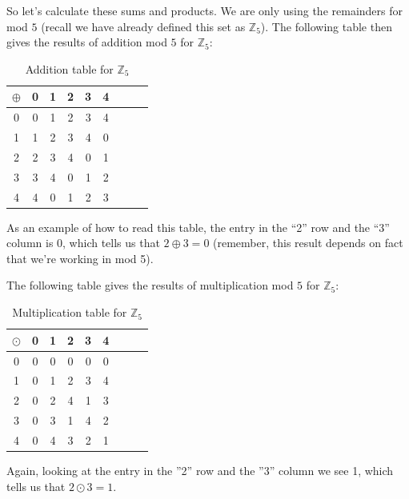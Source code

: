 So let's calculate these sums and products.  We are only using the remainders for mod $5$ (recall we have already defined this set as  ${\mathbb Z}_{5}$).
The following table then gives the results of addition mod $5$ for ${\mathbb Z}_{5}$:

\begin{table}[h]
\caption{\label{groups_Z5_add_table}Addition table for ${\mathbb Z}_5$}{\small
\begin{center}
\begin{tabular}{c|cccccccc}
$\oplus$ & 0 & 1 & 2 & 3 & 4 \\
\hline
0        & 0 & 1 & 2 & 3 & 4 \\
1       & 1 & 2 & 3 & 4 & 0 \\
2       & 2 & 3 & 4 & 0 & 1\\
3       & 3 & 4 & 0 & 1 & 2\\
4       & 4 & 0 & 1 & 2 & 3\\

\end{tabular}
\end{center}
}
\end{table}

\noindent
As an example of how to read this table, the entry in the ``2'' row and the ``3'' column is 0, which tells us that $2 \oplus 3 = 0$ 
(remember, this result depends on fact that we're working in mod 5).

The following table gives the results of multiplication mod $5$ for ${\mathbb Z}_{5}$:

\begin{table}[h]
\caption{\label{groups_Z5_mult_table} Multiplication table for ${\mathbb Z}_5$}
{ \small
\begin{center}
\begin{tabular}{c|cccccccc}
$\odot$ & 0 & 1 & 2 & 3 & 4 \\
\hline
0       & 0 & 0 & 0 & 0 & 0 \\
1       & 0 & 1 & 2 & 3 & 4  \\
2       & 0 & 2 & 4 & 1 & 3  \\
3       & 0 & 3 & 1 & 4 & 2  \\
4       & 0 & 4 & 3 & 2 & 1  \\

\end{tabular}
\end{center}
}
\end{table}

\noindent
Again, looking at the entry in the ''2'' row and the ''3'' column we see 1, which tells us that $2 \odot 3 = 1$.

